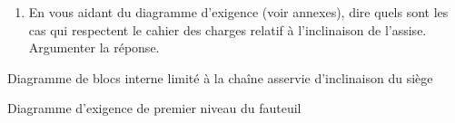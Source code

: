 \begin{enumerate}
\def\labelenumi{\arabic{enumi}.}
\setcounter{enumi}{4}
\item
  En vous aidant du diagramme d'exigence (voir annexes), dire quels sont
  les cas qui respectent le cahier des charges relatif à l'inclinaison
  de l'assise. Argumenter la réponse.
\end{enumerate}


Diagramme de blocs interne limité à la chaîne asservie d'inclinaison du
siège


Diagramme d'exigence de premier niveau du fauteuil
